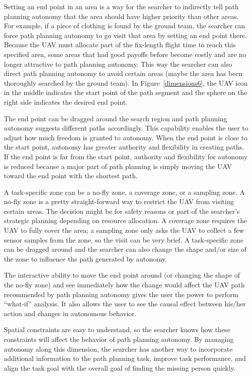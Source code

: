 Setting an end point in an area is a way for the searcher to indirectly tell path planning autonomy that the area should have higher priority than other areas. For example, if a piece of clothing is found by the ground team, the searcher can force path planning autonomy to go visit that area by setting an end point there. Because the UAV must allocate part of the fix-length flight time to reach this specified area, some areas that had good payoffs before become costly and are no longer attractive to path planning autonomy. This way the searcher can also direct path planning autonomy to avoid certain areas (maybe the area has been thoroughly searched by the ground team). In Figure~\ref{dimensions6}, the UAV icon in the middle indicates the start point of the path segment and the sphere on the right side indicates the desired end point. 

The end point can be dragged around the search region and path planning autonomy suggests different paths accordingly. This capability enables the user to adjust how much freedom is granted to autonomy. When the end point is close to the start point, autonomy has greater authority and flexibility in creating paths. If the end point is far from the start point, authority and flexibility for autonomy is reduced because a major part of path planning is simply moving the UAV toward the end point with the shortest path.

A task-specific zone can be a no-fly zone, a coverage zone, or a sampling zone. A no-fly zone is a pretty straight-forward way to restrict the UAV from visiting certain areas. The decision might be for safety reasons or part of the searcher's strategic planning depending on resource allocation. A coverage zone requires the UAV to fully cover the area; a sampling zone only asks the UAV to collect a few sensor samples from the zone, so the visit can be very brief. A task-specific zone can be dragged around and the searcher can also change the shape and/or size of the zone to influence the path generated by autonomy.

The interactive ability to move the end point around (or changing the shape of the no-fly zone) and see immediately how the change would affect the UAV path recommended by path planning autonomy gives the user the power to perform ``what-if'' analysis. It also allows the user to see the causal effect between his/her action and changes in autonomous behavior.

Spatial constraints are easy to understand, so the searcher knows how these constraints will affect the behavior of path planning autonomy. By managing autonomy along this dimension, the searcher has another way to incorporate additional information to the path planning task, improve task performance, and align the task goal with the overall goal of finding the missing person quickly. 

